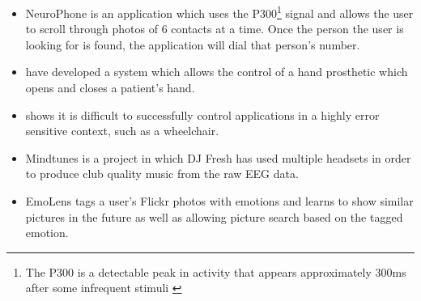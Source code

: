 \begin{itemize}
	\item NeuroPhone \cite{neurophone} is an application which uses the P300\footnote{The P300 is a detectable peak in activity that appears approximately 300ms
after some infrequent stimuli \cite{hons1201}} signal and allows the user to scroll through photos of 6 contacts at a time. Once the person the user is looking for is found, the application will dial that person's number.
	\item \cite{handOrthotic} have developed a system which allows the control of a hand prosthetic which opens and closes a patient's hand.
	\item \cite{wheelchairEEG} shows it is difficult to successfully control applications in a highly error sensitive context, such as a wheelchair. 
	\item Mindtunes \cite{mindtunes} is a project in which DJ Fresh has used multiple headsets in order to produce club quality music from the raw EEG data.   
	\item EmoLens \cite{emoLens} tags a user's Flickr photos with emotions and learns to show similar pictures in the future as well as allowing picture search based on the tagged emotion.
\end{itemize}